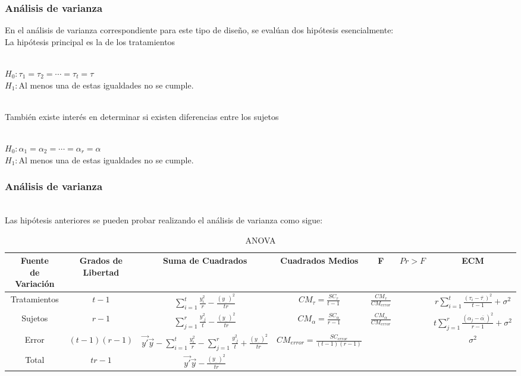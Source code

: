 \documentclass[12pt]{beamer}
\begin{document}
\begin{frame}
\frametitle{Análisis de varianza}
En el análisis de varianza correspondiente para este tipo de diseño, se evalúan dos hipótesis esencialmente:
~\\La hipótesis principal es la de los tratamientos
\begin{center}
~\\$H_0:\tau_1=\tau_2=\cdots=\tau_t=\tau$
~\\$H_1:$Al menos una de estas igualdades no se cumple.
\end{center}
~\\También existe interés en determinar si existen diferencias entre los sujetos
\begin{center}
~\\$H_0:\alpha_1=\alpha_2=\cdots=\alpha_r=\alpha$ 
~\\$H_1:$Al menos una de estas igualdades no se cumple.
\end{center}
\end{frame}

\begin{frame}
\frametitle{Análisis de varianza}
~\\Las hipótesis anteriores se pueden probar realizando el análisis de varianza como sigue:

\begin{table}[htbp]
  \centering
\resizebox{12cm}{!} {
\begin{tabular}{|c|c|c|c|c|c|c|}
\hline 
\parbox{7em}{\centering Fuente\\ de Variación} & \parbox{7em}{\centering Grados de\\ Libertad} & Suma de Cuadrados & Cuadrados Medios & F & $Pr>F$ & ECM \\ 
\hline 
Tratamientos & $t-1$ & $\sum\limits_{i=1}^{t}\frac{y^2_{i.}}{r}-\frac{(y_{..})^2}{tr}$ & $CM_\tau=\frac{SC_\tau}{t-1}$ & $\frac{CM_{\tau}}{CM_{error}}$ &  & $r\sum\limits_{i=1}^{t}\frac{(\tau_i-\bar{\tau_{.}})^2}{t-1}+\sigma^2$\\ 
Sujetos & $r-1$ & $\sum\limits_{j=1}^{r}\frac{y^2_{.j}}{t}-\frac{(y_{..})^2}{tr}$ & $CM_\alpha=\frac{SC_\alpha}{r-1}$ & $\frac{CM_{\alpha}}{CM_{error}}$ & &$t\sum\limits_{j=1}^{r}\frac{(\alpha_{j}-\bar{\alpha_{.}})^2}{r-1}+\sigma^2$ \\
Error & $(t-1)(r-1)$ & $\vec{y'}\vec{y}-\sum\limits_{i=1}^{t}\frac{y^2_{i.}}{r}-\sum\limits_{j=1}^{r}\frac{y^2_{.j}}{t}+\frac{(y_{..})^2}{tr}$ & $CM_{error}=\frac{SC_{error}}{(t-1)(r-1)}$ &   & & $\sigma^2$\\ 
Total & $tr-1$ & $\vec{y'}\vec{y}-\frac{(y_{..})^2}{tr}$ &  &   & &\\ 
\hline 
\end{tabular} 
}
\caption{ANOVA}
\label{tab:addlabel}%
\end{table}%
\end{frame}
\end{document}
